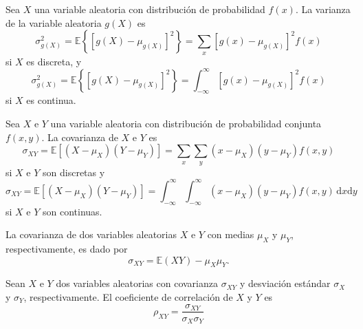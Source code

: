 \begin{theorem}[]
Sea $X$ una variable aleatoria con distribución de probabilidad $f(x)$. La varianza de la variable aleatoria $g\left(X\right)$ es
\begin{equation*}
\sigma^{2}_{g\left(X\right)}=\mathds{E}\left\{{\left[g\left(X\right)-\mu_{g\left(X\right)}\right]}^{2}\right\}=\sum_{x}{\left[g(x)-\mu_{g\left(X\right)}\right]}^{2}f(x)
\end{equation*}
si $X$ es discreta, y
\begin{equation*}
\sigma^{2}_{g\left(X\right)}=\mathds{E}\left\{{\left[g\left(X\right)-\mu_{g\left(X\right)}\right]}^{2}\right\}=\int_{-\infty}^{\infty}{\left[g(x)-\mu_{g\left(X\right)}\right]}^{2}f(x)
\end{equation*}
si $X$ es continua.
\end{theorem}

\begin{definition}[]
Sea $X$ e $Y$ una variable aleatoria con distribución de probabilidad conjunta $f(x,y)$. La covarianza de $X$ e $Y$ es
\begin{equation*}
\sigma_{XY}=\mathds{E}\left[\left(X-\mu_{X}\right)\left(Y-\mu_{Y}\right)\right]=\sum_{x}\sum_{y}\left(x-\mu_{X}\right)\left(y-\mu_{Y}\right)f\left(x,y\right)
\end{equation*}
si $X$ e $Y$ son discretas y
\begin{equation*}
\sigma_{XY}=\mathds{E}\left[\left(X-\mu_{X}\right)\left(Y-\mu_{Y}\right)\right]=\int_{-\infty}^{\infty}\int_{-\infty}^{\infty}\left(x-\mu_{X}\right)\left(y-\mu_{Y}\right)f\left(x,y\right)\,\mathrm{d}x\mathrm{d}y
\end{equation*}
si $X$ e $Y$ son continuas.
\end{definition}

\begin{theorem}
La covarianza de dos variables aleatorias $X$ e $Y$ con medias $\mu_{X}$ y $\mu_{Y}$, respectivamente, es dado por
\begin{equation*}
\sigma_{XY}=\mathds{E}\left(XY\right)-\mu_{X}\mu_{Y}.
\end{equation*}
\end{theorem}

\begin{definition}[]
Sean $X$ e $Y$ dos variables aleatorias con covarianza $\sigma_{XY}$ y desviación estándar $\sigma_{X}$ y $\sigma_{Y}$, respectivamente. El coeficiente de correlación de $X$ y $Y$ es
\begin{equation*}
\rho_{XY}=\frac{\sigma_{XY}}{\sigma_{X}\sigma_{Y}}
\end{equation*}
\end{definition}

